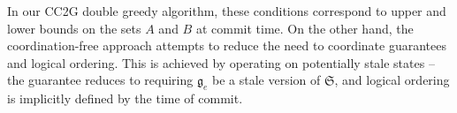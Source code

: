 \documentclass{article} %
\newcommand{\occ}{CC2G}
\newcommand{\Comments}{1}
\newcommand{\note}[2]{\ifnum\Comments=1\textcolor{#1}{#2}\fi}
\newcommand{\xinghao}[1]{\note{red}{[XP: #1]}}
\begin{document}
In our \occ{} double greedy algorithm, these conditions correspond to upper and lower bounds on the sets $A$ and $B$ at commit time.
On the other hand, the coordination-free approach attempts to reduce the need to coordinate guarantees and logical ordering.
This is achieved by operating on potentially stale states -- the guarantee reduces to requiring $\mathfrak{g}_e$ be a stale version of $\mathfrak{S}$, and logical ordering is implicitly defined by the time of commit.















\end{document}
